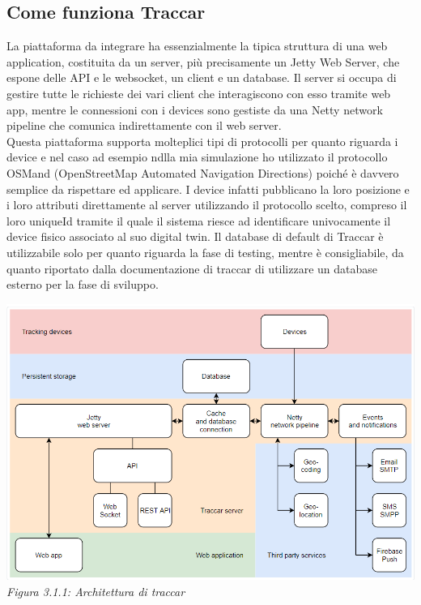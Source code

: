 \documentclass[a4paper,titlepage,12pt]{book}
\begin{document}
\subsection{
\sffamily Come funziona Traccar}
La piattaforma da integrare ha essenzialmente la tipica struttura di una web application, costituita da un server, più precisamente un Jetty Web Server, che espone delle API e le websocket, un client e un database. Il server si occupa di gestire tutte le richieste dei vari client che interagiscono con esso tramite web app, mentre le connessioni con i devices sono gestiste da una Netty network pipeline che comunica indirettamente con il web server. \\
Questa piattaforma supporta molteplici tipi di protocolli per quanto riguarda i device e nel caso ad esempio ndlla mia simulazione ho utilizzato il protocollo OSMand (OpenStreetMap Automated Navigation Directions) poiché è davvero semplice da rispettare ed applicare. I device infatti pubblicano la loro posizione e i loro attributi direttamente al server utilizzando il protocollo scelto, compreso il loro uniqueId tramite il quale il sistema riesce ad identificare univocamente il device fisico associato al suo digital twin. Il database di default di Traccar è utilizzabile solo per quanto riguarda la fase di testing, mentre è consigliabile, da quanto riportato dalla documentazione di traccar di utilizzare un database esterno per la fase di sviluppo. 



\begin{center}
\includegraphics[scale=0.7]{images/arcTraccar.png} \\
\textit{Figura 3.1.1: Architettura di traccar}\label{fig:}
\end{center}
\end{document}
